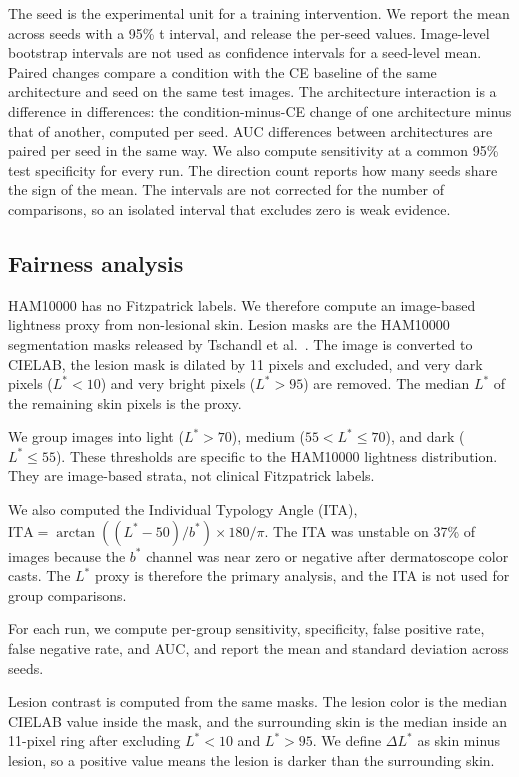 The seed is the experimental unit for a training intervention. We report the mean across seeds with a 95\% t interval, and release the per-seed values. Image-level bootstrap intervals are not used as confidence intervals for a seed-level mean. Paired changes compare a condition with the CE baseline of the same architecture and seed on the same test images. The architecture interaction is a difference in differences: the condition-minus-CE change of one architecture minus that of another, computed per seed. AUC differences between architectures are paired per seed in the same way. We also compute sensitivity at a common 95\% test specificity for every run. The direction count reports how many seeds share the sign of the mean. The intervals are not corrected for the number of comparisons, so an isolated interval that excludes zero is weak evidence.

\subsection{Fairness analysis}

HAM10000 has no Fitzpatrick labels. We therefore compute an image-based lightness proxy from non-lesional skin. Lesion masks are the HAM10000 segmentation masks released by Tschandl et al.\ \citep{tschandl2020human}. The image is converted to CIELAB, the lesion mask is dilated by 11 pixels and excluded, and very dark pixels ($L^*<10$) and very bright pixels ($L^*>95$) are removed. The median $L^*$ of the remaining skin pixels is the proxy.

We group images into light ($L^*>70$), medium ($55<L^*\leq70$), and dark ($L^*\leq55$). These thresholds are specific to the HAM10000 lightness distribution. They are image-based strata, not clinical Fitzpatrick labels.

We also computed the Individual Typology Angle (ITA), $\mathrm{ITA}=\arctan((L^*-50)/b^*)\times180/\pi$. The ITA was unstable on 37\% of images because the $b^*$ channel was near zero or negative after dermatoscope color casts. The $L^*$ proxy is therefore the primary analysis, and the ITA is not used for group comparisons.

For each run, we compute per-group sensitivity, specificity, false positive rate, false negative rate, and AUC, and report the mean and standard deviation across seeds.

Lesion contrast is computed from the same masks. The lesion color is the median CIELAB value inside the mask, and the surrounding skin is the median inside an 11-pixel ring after excluding $L^*<10$ and $L^*>95$. We define $\Delta L^*$ as skin minus lesion, so a positive value means the lesion is darker than the surrounding skin.

